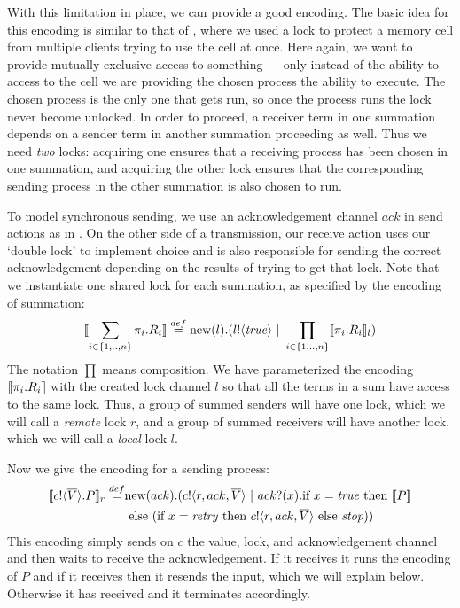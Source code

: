 With this limitation in place, we can provide a good encoding.  
The basic idea for this encoding is similar to that of , where we used a lock to protect a memory cell from multiple clients trying to use the cell at once.  
Here again, we want to provide mutually exclusive access to something --- only instead of the ability to access to the cell we are providing the chosen process the ability to execute.  
The chosen process is the only one that gets run, so once the process runs the lock never become unlocked.  
In order to proceed, a receiver term in one summation depends on a sender term in another summation proceeding as well.
Thus we need \emph{two} locks: acquiring one ensures that a receiving process has been chosen in one summation, and acquiring the other lock ensures that the corresponding sending process in the other summation is also chosen to run.

To model synchronous sending, we use an acknowledgement channel $ack$ in send actions as in .  On the other side of a transmission, our receive action uses our `double lock' to implement choice and is also responsible for sending the correct acknowledgement depending on the results of trying to get that lock.  Note that we instantiate one shared lock for each summation, as specified by the encoding of summation:
\[
	\llbracket{\displaystyle\sum_{i\in \{1,..,n\}} \pi_i.R_i}\rrbracket \overset{\tiny{def}}{=} \text{new}({l}).({l}!\langle{ \ensuremath{\text{\emph{true}}} }\rangle \ |\  \displaystyle\prod_{i\in \{1,..,n\}}\llbracket{\pi_i.R_i}\rrbracket_l)
\]
The notation $\prod$ means composition.  We have parameterized the encoding $\llbracket{\pi_i.R_i}\rrbracket$ with the created lock channel $l$ so that all the terms in a sum have access to the same lock.  Thus, a group of summed senders will have one lock, which we will call a \emph{remote} lock $r$, and a group of summed receivers will have another lock, which we will call a \emph{local} lock $l$.

Now we give the encoding for a sending process:
\begin{equation*}\begin{split}
	\llbracket{ \ensuremath{{c}!\langle{ \ensuremath{\overline{V}} }\rangle.} P}\rrbracket_r \overset{\tiny{def}}{=} & \text{new}({ack}).({c}!\langle{r,ack, \ensuremath{\overline{V}} }\rangle \ |\  {ack}?({x}). \text{if } {x= \ensuremath{\text{\emph{true}}} } \text{ then } \llbracket{P}\rrbracket \\
	&\text{ else } (\text{if } {x= \ensuremath{\text{\emph{retry}}} } \text{ then } {c}!\langle{r,ack, \ensuremath{\overline{V}} }\rangle \text{ else } \mbox{\emph{stop}}))
\end{split}\end{equation*}
This encoding simply sends on $c$ the value, lock, and acknowledgement channel and then waits to receive the acknowledgement.  
If it receives \ptrue it runs the encoding of $P$ and if it receives \pretry then it resends the input, which we will explain below.  Otherwise it has received \pfalse and it terminates accordingly.

